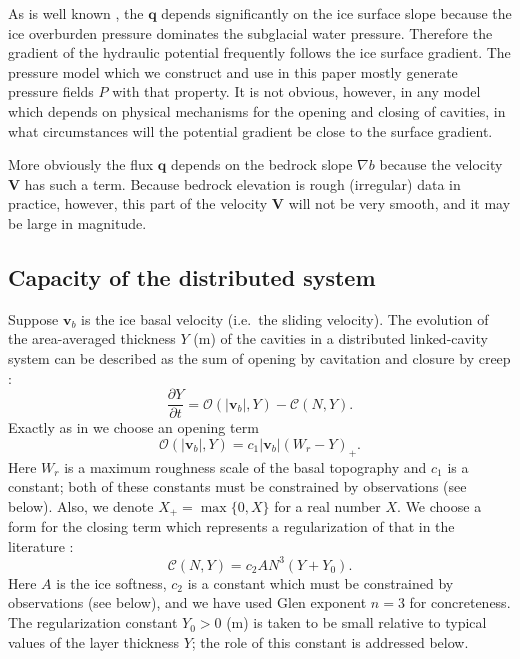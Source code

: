 \documentclass[11pt,final]{amsart}%
\newcommand\bv{\mathbf{v}}
\newcommand\bV{\mathbf{V}}
\newcommand\bq{\mathbf{q}}
\newcommand{\grad}{\nabla}
\begin{document}
As is well known \citep{Clarke05}, the $\bq$ depends significantly on the ice surface slope because the ice overburden pressure dominates the subglacial water pressure.  Therefore the gradient of the hydraulic potential frequently follows the ice surface gradient.  The pressure model which we construct and use in this paper mostly generate pressure fields $P$ with that property.  It is not obvious, however, in any model which depends on physical mechanisms for the opening and closing of cavities, in what circumstances will the potential gradient be close to the surface gradient.

More obviously the flux $\bq$ depends on the bedrock slope $\grad b$ because the velocity $\bV$ has such a term.  Because bedrock elevation is rough (irregular) data in practice, however, this part of the velocity $\bV$ will not be very smooth, and it may be large in magnitude.


\subsection*{Capacity of the distributed system}  Suppose $\bv_b$ is the ice basal velocity (i.e.~the sliding velocity).  The evolution of the area-averaged thickness $Y$ (m) of the cavities in a distributed linked-cavity system \citep{Schoofetal2012} can be described as the sum of opening by cavitation and closure by creep \citep{Hewitt2011}:
\begin{equation}
\frac{\partial Y}{\partial t} = \mathcal{O}(|\bv_b|,Y) - \mathcal{C}(N,Y). \label{eq:hewittcapacity}
\end{equation}
Exactly as in \cite{Schoofetal2012} we choose an opening term
\begin{equation}
 \mathcal{O}(|\bv_b|,Y) = c_1 |\bv_b| (W_r - Y)_+. \label{eq:openingform}
\end{equation}
Here $W_r$ is a maximum roughness scale of the basal topography and $c_1$ is a constant; both of these constants must be constrained by observations (see below).  Also, we denote $X_+= \max\{0,X\}$ for a real number $X$.  We choose a form for the closing term which represents a regularization of that in the literature \citep{Hewitt2011,Schoofmeltsupply,Schoofetal2012}:
\begin{equation}
\mathcal{C}(N,Y) = c_2 A N^3 (Y+Y_0). \label{eq:closingform}
\end{equation}
Here $A$ is the ice softness, $c_2$ is a constant which must be constrained by observations (see below), and we have used Glen exponent $n=3$ for concreteness.  The regularization constant $Y_0>0$ (m) is taken to be small relative to typical values of the layer thickness $Y$; the role of this constant is addressed below.
\end{document}
